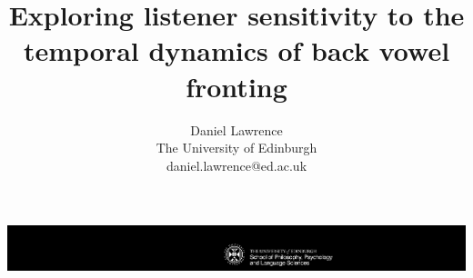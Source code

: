 \documentclass[a0,portrait]{a0poster}
\title{\Huge{Exploring listener sensitivity to the temporal dynamics of back vowel fronting}}
\author{Daniel Lawrence\\The University of Edinburgh\\\hspace{0.5cm}daniel.lawrence@ed.ac.uk}
\begin{document}
\hspace{-6cm}								%
\vspace{-2cm}
\includegraphics{Black_Landscape_portrait.pdf}

\begin{minipage}{1191mm}					%
\vspace{-18cm}
\maketitle
\end{minipage}
\vspace{.5cm}
\end{document}
